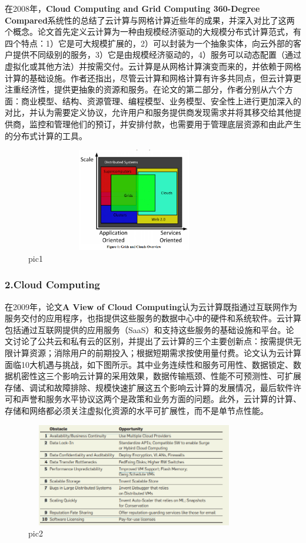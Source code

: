 \documentclass[a4paper,twoside]{scrbook}
\begin{document}
在2008年，\textbf{Cloud Computing and Grid Computing 360-Degree Compared}系统性的总结了云计算与网格计算近些年的成果，并深入对比了这两个概念。论文首先定义云计算为一种由规模经济驱动的大规模分布式计算范式，有四个特点：1）它是可大规模扩展的，2）可以封装为一个抽象实体，向云外部的客户提供不同级别的服务，3）它是由规模经济驱动的，4）服务可以动态配置（通过虚拟化或其他方法）并按需交付。云计算是从网格计算演变而来的，并依赖于网格计算的基础设施。作者还指出，尽管云计算和网格计算有许多共同点，但云计算更注重经济性，提供更抽象的资源和服务。在论文的第二部分，作者分别从六个方面：商业模型、结构、资源管理、编程模型、业务模型、安全性上进行更加深入的对比，并认为需要定义协议，允许用户和服务提供商发现需求并将其移交给其他提供商，监控和管理他们的预订，并安排付款，也需要用于管理底层资源和由此产生的分布式计算的工具。
\begin{figure}
\centering %
\includegraphics[height=4.5cm,width=9.5cm]{compared.png}
\caption{pic1}
\end{figure}


\subsubsection{2.Cloud Computing}
在2009年，论文\textbf{A View of Cloud Computing}认为云计算既指通过互联网作为服务交付的应用程序，也指提供这些服务的数据中心中的硬件和系统软件。云计算包括通过互联网提供的应用服务（SaaS）和支持这些服务的基础设施和平台。论文讨论了公共云和私有云的区别，并提出了云计算的三个主要创新点：按需提供无限计算资源；消除用户的前期投入；根据短期需求按使用量付费。论文认为云计算面临10大机遇与挑战，如下图所示。其中业务连续性和服务可用性、数据锁定、数据机密性这三个影响云计算的采用效果，数据传输瓶颈、性能不可预测性、可扩展存储、调试和故障排除、规模快速扩展这五个影响云计算的发展情况，最后软件许可和声誉和服务水平协议这两个是政策和业务方面的问题。此外，云计算的计算、存储和网络都必须关注虚拟化资源的水平可扩展性，而不是单节点性能。
\begin{figure}
\centering %
\includegraphics[height=4.5cm,width=9.5cm]{cloud10.png}
\caption{pic2}
\end{figure}
\end{document}
